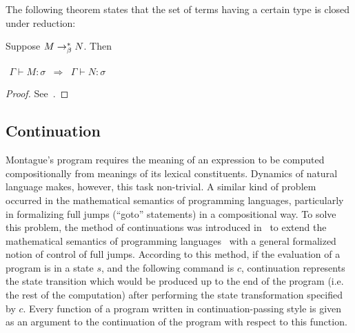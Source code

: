 The following theorem states that the set of terms having a certain type is closed under reduction:
\begin{theorem} Suppose $M \rightarrow^{*}_\beta N$. Then 
\begin{center}
$
\begin{array}{rcl}
\Gamma \vdash M: \sigma &\Longrightarrow & \Gamma \vdash N: \sigma
\end{array}
$
\end{center}
\end{theorem}
\begin{proof} See~\cite[p.41]{Barendregt:1992:Lambda-Calculi-with-Types}.
\end{proof}

\subsection{Continuation}

Montague's program requires the meaning of an expression to be computed compositionally from meanings of its lexical constituents. Dynamics of natural language makes, however, this task non-trivial. A similar kind of problem occurred in the mathematical semantics of programming languages, particularly in formalizing full jumps (``goto'' statements) in a compositional way. To solve this problem, the method of continuations was introduced in~\cite{StracheyWadsworth:1974:Continuations:-A-Mathematical-Semantics-for-Handling-Full-Jumps} to extend the mathematical semantics of programming languages~\cite{ScottStrachey:1971:Toward-a-Mathematical-Semantics-for-Computer-Languages} with a general formalized notion of control of full jumps. According to this method, if the evaluation of a program is in a state $s$, and the following command is $c$, continuation represents the state transition which would be produced up to the end of the program (i.e. the rest of the computation) after performing the state transformation specified by $c$. Every function of a program written in continuation-passing style is given as an argument to the continuation of the program with respect to this function. 


